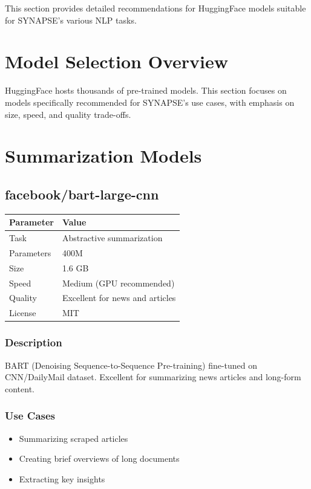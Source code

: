 \documentclass[12pt,a4paper]{report}
\begin{document}
This section provides detailed recommendations for HuggingFace models suitable for SYNAPSE's various NLP tasks.

\section{Model Selection Overview}

HuggingFace hosts thousands of pre-trained models. This section focuses on models specifically recommended for SYNAPSE's use cases, with emphasis on size, speed, and quality trade-offs.

\section{Summarization Models}

\subsection{facebook/bart-large-cnn}

\begin{tabular}{|p{3cm}|p{11cm}|}
\hline
\textbf{Parameter} & \textbf{Value} \\
\hline
Task & Abstractive summarization \\
\hline
Parameters & 400M \\
\hline
Size & 1.6 GB \\
\hline
Speed & Medium (GPU recommended) \\
\hline
Quality & Excellent for news and articles \\
\hline
License & MIT \\
\hline
\end{tabular}

\subsubsection{Description}

BART (Denoising Sequence-to-Sequence Pre-training) fine-tuned on CNN/DailyMail dataset. Excellent for summarizing news articles and long-form content.

\subsubsection{Use Cases}

\begin{itemize}
    \item Summarizing scraped articles
    \item Creating brief overviews of long documents
    \item Extracting key insights
\end{itemize}
\end{document}
